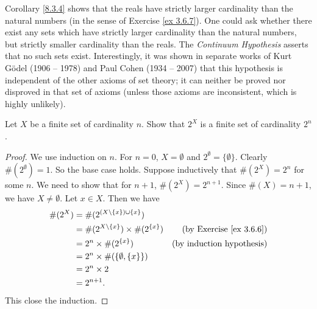 \setcounter{theorem}{5}
\begin{remark}\label{8.3.6}
    Corollary \ref{8.3.4} shows that the reals have strictly larger cardinality than the natural numbers (in the sense of Exercise \ref{ex 3.6.7}).
    One could ask whether there exist any sets which have strictly larger cardinality than the natural numbers, but strictly smaller cardinality than the reals.
    The \emph{Continuum Hypothesis} asserts that no such sets exist.
    Interestingly, it was shown in separate works of Kurt Gödel (1906 -- 1978) and Paul Cohen (1934 -- 2007) that this hypothesis is independent of the other axioms of set theory;
    it can neither be proved nor disproved in that set of axioms
    (unless those axioms are inconsistent, which is highly unlikely).
\end{remark}

\exercisesection

\begin{exercise}\label{ex 8.3.1}
    Let \(X\) be a finite set of cardinality \(n\).
    Show that \(2^X\) is a finite set of cardinality \(2^n\).
\end{exercise}

\begin{proof}
    We use induction on \(n\).
    For \(n = 0\), \(X = \emptyset\) and \(2^{\emptyset} = \{\emptyset\}\).
    Clearly \(\#(2^{\emptyset}) = 1\).
    So the base case holds.
    Suppose inductively that \(\#(2^X) = 2^n\) for some \(n\).
    We need to show that for \(n + 1\), \(\#(2^X) = 2^{n + 1}\).
    Since \(\#(X) = n + 1\), we have \(X \neq \emptyset\).
    Let \(x \in X\).
    Then we have
    \begin{align*}
        \#(2^X) & = \#(2^{(X \setminus \{x\}) \cup \{x\}})                                               \\
                & = \#(2^{X \setminus \{x\}}) \times \#(2^{\{x\}}) & \text{(by Exercise \ref{ex 3.6.6})} \\
                & = 2^n \times \#(2^{\{x\}})                       & \text{(by induction hypothesis)}    \\
                & = 2^n \times \#(\{\emptyset, \{x\}\})                                                  \\
                & = 2^n \times 2                                                                         \\
                & = 2^{n + 1}.
    \end{align*}
    This close the induction.
\end{proof}

